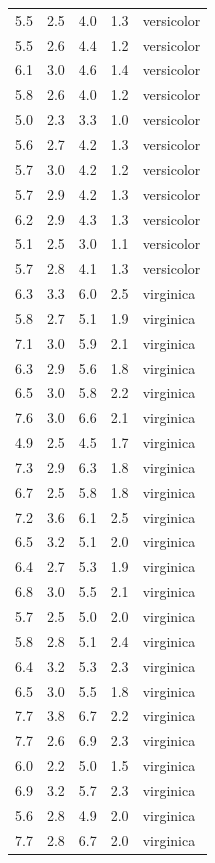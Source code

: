 \documentclass[
  letterpaper,
  DIV=11,
  numbers=noendperiod]{scrreprt}
\begin{document}
\begin{longtable}[]{@{}rrrrl@{}}
5.5 & 2.5 & 4.0 & 1.3 & versicolor \\
5.5 & 2.6 & 4.4 & 1.2 & versicolor \\
6.1 & 3.0 & 4.6 & 1.4 & versicolor \\
5.8 & 2.6 & 4.0 & 1.2 & versicolor \\
5.0 & 2.3 & 3.3 & 1.0 & versicolor \\
5.6 & 2.7 & 4.2 & 1.3 & versicolor \\
5.7 & 3.0 & 4.2 & 1.2 & versicolor \\
5.7 & 2.9 & 4.2 & 1.3 & versicolor \\
6.2 & 2.9 & 4.3 & 1.3 & versicolor \\
5.1 & 2.5 & 3.0 & 1.1 & versicolor \\
5.7 & 2.8 & 4.1 & 1.3 & versicolor \\
6.3 & 3.3 & 6.0 & 2.5 & virginica \\
5.8 & 2.7 & 5.1 & 1.9 & virginica \\
7.1 & 3.0 & 5.9 & 2.1 & virginica \\
6.3 & 2.9 & 5.6 & 1.8 & virginica \\
6.5 & 3.0 & 5.8 & 2.2 & virginica \\
7.6 & 3.0 & 6.6 & 2.1 & virginica \\
4.9 & 2.5 & 4.5 & 1.7 & virginica \\
7.3 & 2.9 & 6.3 & 1.8 & virginica \\
6.7 & 2.5 & 5.8 & 1.8 & virginica \\
7.2 & 3.6 & 6.1 & 2.5 & virginica \\
6.5 & 3.2 & 5.1 & 2.0 & virginica \\
6.4 & 2.7 & 5.3 & 1.9 & virginica \\
6.8 & 3.0 & 5.5 & 2.1 & virginica \\
5.7 & 2.5 & 5.0 & 2.0 & virginica \\
5.8 & 2.8 & 5.1 & 2.4 & virginica \\
6.4 & 3.2 & 5.3 & 2.3 & virginica \\
6.5 & 3.0 & 5.5 & 1.8 & virginica \\
7.7 & 3.8 & 6.7 & 2.2 & virginica \\
7.7 & 2.6 & 6.9 & 2.3 & virginica \\
6.0 & 2.2 & 5.0 & 1.5 & virginica \\
6.9 & 3.2 & 5.7 & 2.3 & virginica \\
5.6 & 2.8 & 4.9 & 2.0 & virginica \\
7.7 & 2.8 & 6.7 & 2.0 & virginica \\

\end{longtable}
\end{document}

